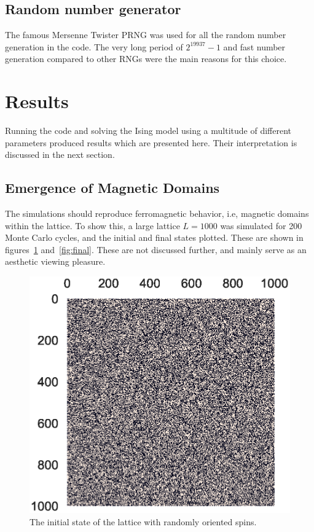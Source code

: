 \documentclass[aps,reprint]{revtex4-1}
\begin{document}
\subsection{Random number generator}
The famous Mersenne Twister PRNG was used for all the random number generation
in the code. The very long period of $2^{19937} - 1$ and fast number generation
compared to other RNGs were the main reasons for this choice.

\section{Results}
\label{sec:results}

Running the code and solving the Ising model using a multitude of different
parameters produced results which are presented here. Their interpretation is
discussed in the next section.

\subsection{Emergence of Magnetic Domains}
\label{sec:emerg-magn-doma}

The simulations should reproduce ferromagnetic behavior, i.e, magnetic domains
within the lattice. To show this, a large lattice \(L=1000\) was simulated for
200 Monte Carlo cycles, and the initial and final states plotted. These are
shown in figures~\ref{fig:initial} and~\ref{fig:final}. These are not discussed further,
and mainly serve as an aesthetic viewing pleasure.

\begin{figure}[H]
  \centering
  \includegraphics[width=\columnwidth]{figures/initial.eps}
  \caption{\label{fig:initial} The initial state of the lattice with randomly
    oriented spins.}
\end{figure}
\end{document}
